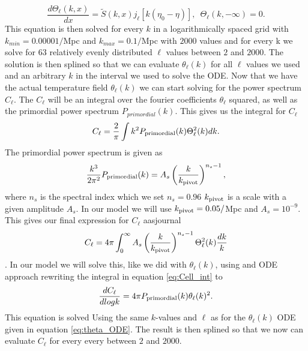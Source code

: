 \documentclass[onecolumn]{aastex62}
\begin{document}
\begin{equation}\label{eq:theta_ODE}
    \frac{d\Theta_\ell(k, x)}{dx} = \tilde{S}(k,x) j_\ell[k(\eta_0-\eta)],\,\,\, \Theta_\ell(k, -\infty) = 0.
\end{equation}
This equation is then solved for every $k$ in a logarithmically spaced grid with $k_{min}=0.00001/$Mpc and $k_{max}=0.1/$Mpc with $2000$ values and for every k we solve for $63$ relatively evenly distributed $\ell$ values between $2$ and $2000$. The solution is then splined so that we can evaluate $\theta_\ell(k)$ for all $\ell$ values we used and an arbitrary $k$ in the interval we used to solve the ODE. Now that we have the actual temperature field $\theta_\ell(k)$ we can start solving for the power spectrum $C_\ell$. The $C_\ell$ will be an integral over the fourier coefficients $\theta_\ell$ squared, as well as the primordial power spectrum $P_{primordial}(k)$. This gives us the integral for $C_\ell$
\begin{equation}
    C_\ell = \frac{2}{\pi}\int k^2P_{\rm primordial}(k) \Theta_\ell^2(k)dk.
\end{equation}
The primordial power spectrum is given as
\begin{equation}
    \frac{k^3}{2\pi^2} P_{\rm primordial}(k) = A_s \left(\frac{k}{k_{\rm pivot}}\right)^{n_s-1},
\end{equation}
where $n_s$ is the spectral index which we set $n_s=0.96$ $k_{\rm pivot}$ is a scale with a given amplitude $A_s$. In our model we will use $k_{\rm pivot} = 0.05/$Mpc and $A_s=10^{-9}$. This gives our final expression for $C_\ell$ aasjournal
\begin{equation}\label{eq:Cell_int}
    C_\ell = 4\pi \int_0^{\infty} A_s \left(\frac{k}{k_{\rm pivot}}\right)^{n_s-1} \Theta_{\ell}^2(k) \frac{dk}{k}
\end{equation}
\cite{WintherIV:2020}. In our model we will solve this, like we did with $\theta_{\ell}(k)$, using and ODE approach rewriting the integral in equation \ref{eq:Cell_int} to 
\begin{equation}\label{eq:Cell_ODE}
    \frac{dC_{\ell}}{dlogk} = 4 \pi P_{\rm primordial}(k) \theta_{\ell}(k)^2.
\end{equation}
This equation is solved Using the same $k$-values and $\ell$ as for the $\theta_{\ell}(k)$ ODE given in equation \ref{eq:theta_ODE}. The result is then splined so that we now can evaluate $C_{\ell}$ for every every between $2$ and $2000$.
\end{document}

